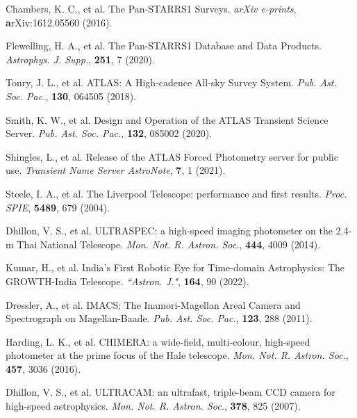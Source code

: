 \documentclass{nature_plusfigure}
\newcommand{\mn}{{Mon. Not. R. Astron. Soc.}}
\newcommand{\mnras}{\mn}
\newcommand{\aj}{{``Astron. J."}}
\newcommand{\apjs}{{Astrophys. J. Supp.}}
\newcommand{\pasp}{{Pub. Ast. Soc. Pac.}}
\newcommand{\procspie}{Proc. SPIE}
\begin{document}
\begin{methods}
\begin{thebibliography}{10}
 Chambers, K. C., et al. The Pan-STARRS1 Surveys. \emph{arXiv e-prints}, \textbf arXiv:1612.05560 (2016). 

  Flewelling, H. A., et al. The Pan-STARRS1 Database and Data Products. \emph{\apjs}, \textbf{251}, 7 (2020). 


 Tonry, J. L., et al. ATLAS: A High-cadence All-sky Survey System. \emph{\pasp}, \textbf{130}, 064505 (2018). 

 Smith, K. W., et al. Design and Operation of the ATLAS Transient Science Server. \emph{\pasp}, \textbf{132}, 085002 (2020). 

 Shingles, L., et al. Release of the ATLAS Forced Photometry server for public use. \emph{Transient Name Server AstroNote}, \textbf{7}, 1 (2021). 


 Steele, I. A., et al. The Liverpool Telescope: performance and first results. \emph{\procspie}, \textbf{5489}, 679 (2004). 


 Dhillon, V. S., et al. ULTRASPEC: a high-speed imaging photometer on the 2.4-m Thai National Telescope. \emph{\mnras}, \textbf{444}, 4009 (2014). 


 Kumar, H., et al. India's First Robotic Eye for Time-domain Astrophysics: The GROWTH-India Telescope. \emph{\aj}, \textbf{164}, 90 (2022). 



 Dressler, A., et al. IMACS: The Inamori-Magellan Areal Camera and Spectrograph on Magellan-Baade. \emph{\pasp}, \textbf{123}, 288 (2011). 


 Harding, L. K., et al. CHIMERA: a wide-field, multi-colour, high-speed photometer at the prime focus of the Hale telescope. \emph{\mnras}, \textbf{457}, 3036 (2016). 

 Dhillon, V. S., et al. ULTRACAM: an ultrafast, triple-beam CCD camera for high-speed astrophysics. \emph{\mnras}, \textbf{378}, 825 (2007). 


\end{thebibliography}
\end{methods}
\end{document}
